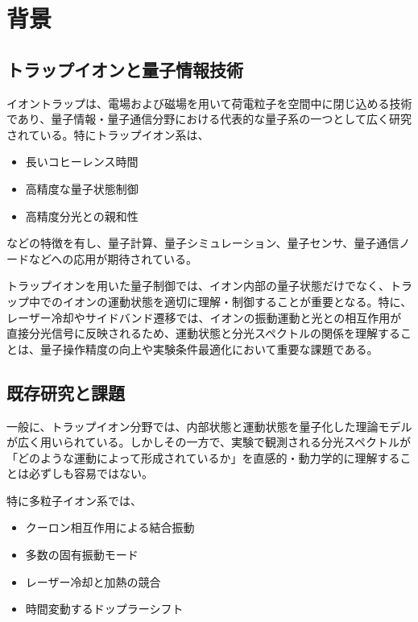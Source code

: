 \section{背景}

\subsection{トラップイオンと量子情報技術}

イオントラップは、電場および磁場を用いて荷電粒子を空間中に閉じ込める技術であり、量子情報・量子通信分野における代表的な量子系の一つとして広く研究されている。特にトラップイオン系は、

\begin{itemize}
    \item 長いコヒーレンス時間
    \item 高精度な量子状態制御
    \item 高精度分光との親和性
\end{itemize}

などの特徴を有し、量子計算、量子シミュレーション、量子センサ、量子通信ノードなどへの応用が期待されている。

トラップイオンを用いた量子制御では、イオン内部の量子状態だけでなく、トラップ中でのイオンの運動状態を適切に理解・制御することが重要となる。特に、レーザー冷却やサイドバンド遷移では、イオンの振動運動と光との相互作用が直接分光信号に反映されるため、運動状態と分光スペクトルの関係を理解することは、量子操作精度の向上や実験条件最適化において重要な課題である。

\subsection{既存研究と課題}

一般に、トラップイオン分野では、内部状態と運動状態を量子化した理論モデルが広く用いられている。しかしその一方で、実験で観測される分光スペクトルが「どのような運動によって形成されているか」を直感的・動力学的に理解することは必ずしも容易ではない。

特に多粒子イオン系では、

\begin{itemize}
    \item クーロン相互作用による結合振動
    \item 多数の固有振動モード
    \item レーザー冷却と加熱の競合
    \item 時間変動するドップラーシフト
\end{itemize}

